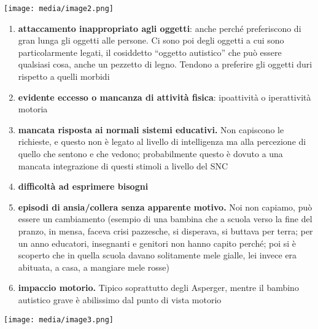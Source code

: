 \documentclass[]{article}
\begin{document}
\texttt{[image: media/image2.png]}

\begin{enumerate}
\def\labelenumi{\arabic{enumi}.}
\item
  \textbf{attaccamento inappropriato agli oggetti}: anche perché
  preferiscono di gran lunga gli oggetti alle persone. Ci sono poi degli
  oggetti a cui sono particolarmente legati, il cosiddetto ``oggetto
  autistico'' che può essere qualsiasi cosa, anche un pezzetto di legno.
  Tendono a preferire gli oggetti duri rispetto a quelli morbidi
\item
  \textbf{evidente eccesso o mancanza di attività fisica}: ipoattività o
  iperattività motoria
\item
  \textbf{mancata risposta ai normali sistemi educativi.} Non capiscono
  le richieste, e questo non è legato al livello di intelligenza ma alla
  percezione di quello che sentono e che vedono; probabilmente questo è
  dovuto a una mancata integrazione di questi stimoli a livello del SNC
\item
  \textbf{difficoltà ad esprimere bisogni}
\item
  \textbf{episodi di ansia/collera senza apparente motivo.} Noi non
  capiamo, può essere un cambiamento (esempio di una bambina che a
  scuola verso la fine del pranzo, in mensa, faceva crisi pazzesche, si
  disperava, si buttava per terra; per un anno educatori, insegnanti e
  genitori non hanno capito perché; poi si è scoperto che in quella
  scuola davano solitamente mele gialle, lei invece era abituata, a
  casa, a mangiare mele rosse)
\item
  \textbf{impaccio motorio.} Tipico soprattutto degli Asperger, mentre
  il bambino autistico grave è abilissimo dal punto di vista motorio
\end{enumerate}

\texttt{[image: media/image3.png]}
\end{document}
